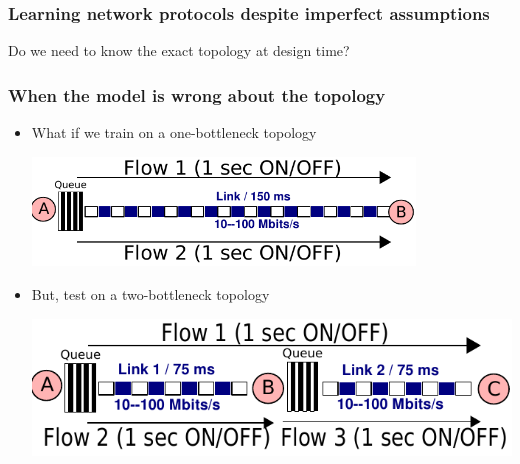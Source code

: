 \begin{frame}
\frametitle{Learning network protocols despite imperfect assumptions}
\begin{centering}
Do we need to know the exact topology at design time?
\end{centering}
\end{frame}

\begin{frame}
\frametitle{When the model is wrong about the topology}
\large
\begin{centering}

\begin{itemize}
\item<2-> What if we train on a one-bottleneck topology\\
\begin{centering}
\includegraphics[width=0.8\textwidth]{onelink.pdf}
\end{centering}
\item<3-> But, test on a two-bottleneck topology\\
\begin{centering}
\includegraphics[width=0.8 \textwidth]{twolink.pdf}
\end{centering}
\end{itemize}
\end{centering}
\end{frame}

